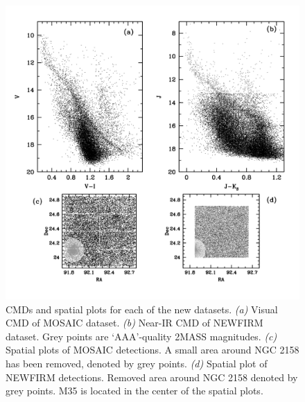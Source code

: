 \documentclass[iop]{emulateapj}
\begin{document}
\begin{figure} \centering
\includegraphics[trim = 0mm 28mm 20mm 20mm, clip, width=6in]{fig3.png}		%
\caption{CMDs and spatial plots for each of the new datasets. \emph{(a)} Visual CMD of MOSAIC dataset. \emph{(b)} Near-IR CMD of NEWFIRM dataset. Grey points are `AAA'-quality 2MASS magnitudes. \emph{(c)} Spatial plots of MOSAIC detections. A small area around NGC 2158 has been removed, denoted by grey points. \emph{(d)} Spatial plot of NEWFIRM detections. Removed area around NGC 2158 denoted by grey points. M35 is located in the center of the spatial plots. \label{fig:finalphot}}
\end{figure}
\end{document}
